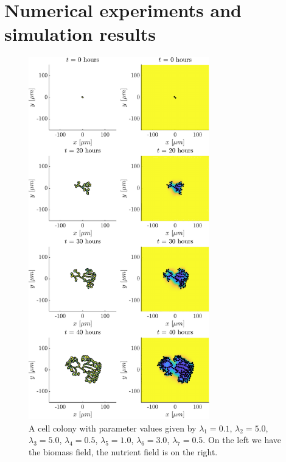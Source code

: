 \chapter{Numerical experiments and simulation results}


\begin{figure}[!htb] %
    \centering
    \includegraphics[width= 0.7\textwidth]{
        chapter3/figures/t_all_L1_0o10_L2_5o00_L3_5o00_L4_0o50_L5_1o00_L6_3o00_L7_0o50.pdf}
    \caption{A cell colony with parameter values given by
             $\lambda_1 = 0.1$,  
             $\lambda_2 = 5.0$, 
             $\lambda_3 = 5.0$, 
             $\lambda_4 = 0.5$, 
             $\lambda_5 = 1.0$, 
             $\lambda_6 = 3.0$, 
             $\lambda_7 = 0.5$. 
             On the left we have the biomass field, the nutrient field is on the right.}
    \label{fig: sdsd}
\end{figure}

